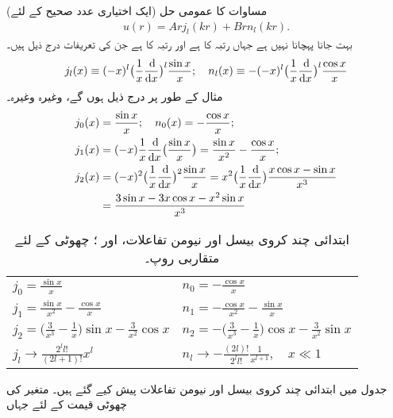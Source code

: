 (ایک اختیاری عدد صحیح  کے لئے) مساوات  کا عمومی حل
\begin{align}
u(r)=Arj_{l}(kr)+Brn_{l}(kr). 
\end{align}
 بہت جانا پہچانا نہیں ہے  جہاں  رتبہ  کا   ہے اور  رتبہ  کا    ہے جن کی تعریفات درج ذیل ہیں۔  
\begin{align}\label{مساوات_ابعادی_تعریفات_کروی_بیسل_نیومن}
j_{l}(x)\equiv(-x)^{l}\big(\frac{1}{x}\frac{\dif}{\dif x}\big)^{l}\frac{\sin x}{x};\quad n_{l}(x)\equiv-(-x)^{l}
\big(\frac{1}{x}\frac{\dif}{\dif x}\big)^{l}\frac{\cos x}{x}
\end{align}
مثال کے طور پر درج ذیل ہوں گے، وغیرہ وغیرہ۔
\begin{align*}
j_{0}(x)&=\frac{\sin x}{x};\quad n_{0}(x)=-\frac{\cos x}{x};\\
j_1(x)&=(-x)\frac{1}{x}\frac{\dif}{\dif x}\big(\frac{\sin x}{x}\big)=\frac{\sin x}{x^{2}}-\frac{\cos x}{x};\\
j_{2}(x)&=(-x)^{2}\big(\frac{1}{x}\frac{\dif}{\dif x}\big)^{2}\frac{\sin x}{x}=x^{2}\big(\frac{1}{x}\frac{\dif}{\dif x}\big)\frac{x\cos x-\sin x}{x^{3}}\\
&=\frac{3\sin x-3x\cos x-x^2\sin x}{x^{3}}
\end{align*}
\begin{table}
\caption{
ابتدائی چند کروی بیسل اور نیومن تفاعلات،  اور ؛ چھوٹی  کے لئے متقاربی روپ۔
}
\label{جدول_ابعادی_کروی_بیسل_نیومن_تفاعلات}
\centering
\renewcommand{\arraystretch}{2} 
\begin{tabular}{ll}
\toprule
$j_0=\frac{\sin x}{x}$  &  $n_0=-\frac{\cos x}{x}$\\
$j_1=\frac{\sin x}{x^2}-\frac{\cos x}{x}$  &  $n_1=-\frac{\cos x}{x^2}-\frac{\sin x}{x}$\\
$j_2=\big(\frac{3}{x^3}-\frac{1}{x}\big)\sin x-\frac{3}{x^2}\cos x$  &  $n_2=-\big(\frac{3}{x^3}-\frac{1}{x}\big)\cos x-\frac{3}{x^2}\sin x$\\[0.5em]
\midrule
$j_l\to\frac{2^l l!}{(2l+1)!}x^l$  &  $n_l\to -\frac{(2l)!}{2^ll!}\frac{1}{x^{l+1}},\quad x\ll 1$\\
\bottomrule
\end{tabular}
\end{table}
جدول  میں ابتدائی چند کروی بیسل اور نیومن تفاعلات پیش کیے گئے ہیں۔ متغیر  کی چھوٹی قیمت کے لئے جہاں
